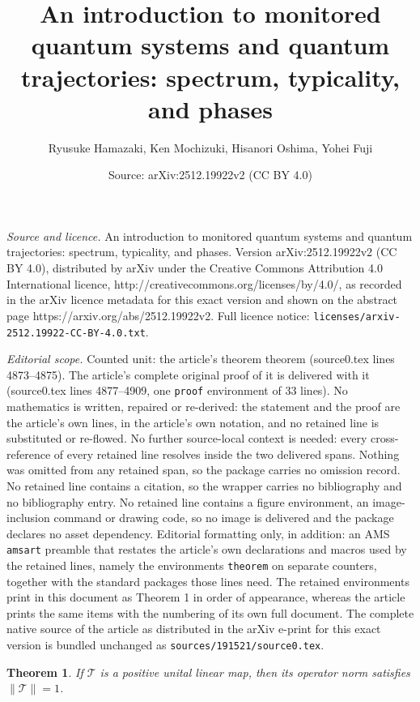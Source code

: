 \documentclass[10pt,a4paper]{amsart}
\title{An introduction to monitored quantum systems and quantum trajectories: spectrum, typicality, and phases}
\author{Ryusuke Hamazaki, Ken Mochizuki, Hisanori Oshima, Yohei Fuji}
\date{Source: arXiv:2512.19922v2 (CC BY 4.0)}
\newtheorem{theorem}{Theorem}
\newcommand{\mc}[1]{\mathcal{#1}}
\begin{document}
\maketitle

\noindent\emph{Source and licence.} An introduction to monitored quantum systems and quantum trajectories: spectrum, typicality, and phases. Version arXiv:2512.19922v2 (CC BY 4.0), distributed by arXiv under the Creative Commons Attribution 4.0 International licence, http://creativecommons.org/licenses/by/4.0/, as recorded in the arXiv licence metadata for this exact version and shown on the abstract page https://arxiv.org/abs/2512.19922v2. Full licence notice: \texttt{licenses/arxiv-2512.19922-CC-BY-4.0.txt}.\par\smallskip

\noindent\textit{Editorial scope.} Counted unit: the article's theorem theorem (source0.tex lines 4873--4875). The article's complete original proof of it is delivered with it (source0.tex lines 4877--4909, one \texttt{proof} environment of 33 lines). No mathematics is written, repaired or re-derived: the statement and the proof are the article's own lines, in the article's own notation, and no retained line is substituted or re-flowed.  No further source-local context is needed: every cross-reference of every retained line resolves inside the two delivered spans.  Nothing was omitted from any retained span, so the package carries no omission record.  No retained line contains a citation, so the wrapper carries no bibliography and no bibliography entry.  No retained line contains a figure environment, an image-inclusion command or drawing code, so no image is delivered and the package declares no asset dependency.  Editorial formatting only, in addition: an AMS \texttt{amsart} preamble that restates the article's own declarations and macros used by the retained lines, namely the environments \texttt{theorem} on separate counters, together with the standard packages those lines need.  The retained environments print in this document as Theorem 1 in order of appearance, whereas the article prints the same items with the numbering of its own full document.  The complete native source of the article as distributed in the arXiv e-print for this exact version is bundled unchanged as \texttt{sources/191521/source0.tex}.
\begin{theorem}
If $\mc{T}$ is a positive unital linear map, then its operator norm satisfies $\lVert \mc{T} \rVert = 1$.
\end{theorem}
\end{document}
